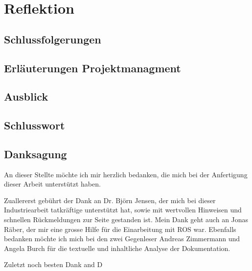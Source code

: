 \chapter{Reflektion}
\label{chap:Reflektion}

\section{Schlussfolgerungen}
\label{sec:}

\section{Erläuterungen Projektmanagment}
\label{sec: pm}


\section{Ausblick}
\label{sec: Ausblick}

\section{Schlusswort}


\section{Danksagung}
An dieser Stellte möchte ich mir herzlich bedanken, die mich bei der Anfertigung dieser Arbeit unterstützt haben.

Zuallererst gebührt der Dank an Dr. Björn Jensen, der mich bei dieser Industriearbeit tatkräftige unterstützt hat, sowie mit wertvollen Hinweisen und schnellen Rückmeldungen zur Seite gestanden ist.
Mein Dank geht auch an Jonas Räber, der mir eine grosse Hilfe für die Einarbeitung mit \ac{ROS} war. Ebenfalls bedanken möchte ich mich bei den zwei Gegenleser Andreas Zimmermann und Angela Burch für die textuelle und inhaltliche Analyse der Dokumentation.

Zuletzt noch besten Dank and D 

